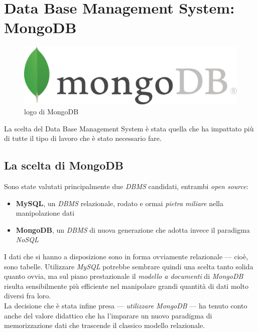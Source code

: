 \section{Data Base Management System: MongoDB}

    \begin{figure}
        \centering
        \caption{logo di MongoDB}
        \label{mongodb_logo}
    	\includegraphics[scale=0.65]{img/mongodb.png}
    \end{figure}

    La scelta del Data Base Management System è stata quella che ha impattato più di tutte il tipo di lavoro che è stato necessario fare.

    \subsection{La scelta di MongoDB}
    
        Sono state valutati principalmente due \textit{DBMS} candidati, entrambi \textit{open source}:

        \begin{itemize}
            \item \textbf{MySQL}, un \textit{DBMS} relazionale, rodato e ormai \textit{pietra miliare} nella manipolazione dati
            \item \textbf{MongoDB}, un \textit{DBMS} di nuova generazione che adotta invece il paradigma \textit{NoSQL} 
        \end{itemize}

        I dati che si hanno a disposizione sono in forma ovviamente relazionale --- cioè, sono tabelle. Utilizzare \textit{MySQL} potrebbe sembrare quindi una scelta tanto solida quanto ovvia, ma sul piano prestazionale il \textit{modello a documenti} di \textit{MongoDB} risulta sensibilmente più efficiente nel manipolare grandi quantità di dati molto diversi fra loro. \\

        La decisione che è stata infine presa --- \textit{utilizzare MongoDB} --- ha tenuto conto anche del valore didattico che ha l'imparare un nuovo paradigma di memorizzazione dati che trascende il classico modello relazionale.

